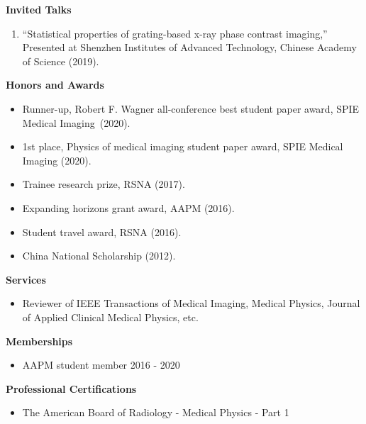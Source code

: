 \documentclass[letterpaper,11pt]{article}
\newcommand{\resheading}[1]{{\large \colorbox{mygrey}{\begin{minipage}{\textwidth}{\textbf{#1 \vphantom{p\^{E}}}}\end{minipage}}}}
\begin{document}
\resheading {Invited Talks}
\begin{enumerate}\justifying
\item ``Statistical properties of grating-based x-ray phase contrast imaging,'' Presented at Shenzhen Institutes of Advanced Technology, Chinese Academy of Science (2019).
\end{enumerate}
\resheading{{Honors and Awards}}
\begin{itemize}\justifying
\item Runner-up, Robert F. Wagner all-conference best student paper award, SPIE Medical Imaging~(2020).
\item 1st place, Physics of medical imaging student paper award, SPIE Medical Imaging (2020).
\item Trainee research prize, RSNA (2017).
\item Expanding horizons grant award, AAPM (2016).
\item Student travel award, RSNA (2016).
\item China National Scholarship (2012).
\end{itemize}
\resheading{Services}
\begin{itemize}
\item Reviewer of IEEE Transactions of Medical Imaging, Medical Physics, Journal of Applied Clinical Medical Physics, etc. 
\end{itemize}
\resheading{Memberships}
\begin{itemize}
\item AAPM student member \cftdotfill{\cftdotsep} 2016 - 2020
\end{itemize}
\resheading{Professional Certifications}
\begin{itemize}
\item The American Board of Radiology - Medical Physics - Part 1
\end{itemize}
\end{document}
